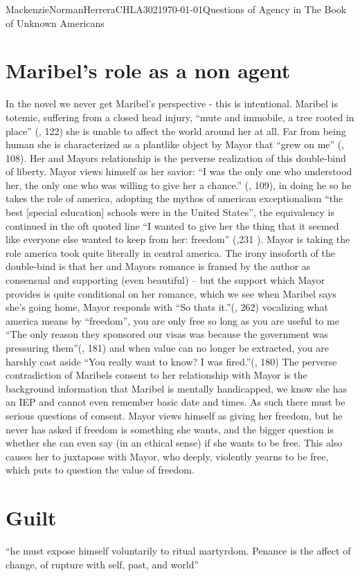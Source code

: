 \documentclass{article}
\begin{document}
\begin{mla}{Mackenzie}{Norman}{Herrera}{CHLA302}{\today}{Questions of Agency in The Book of Unknown Americans}
\section*{Maribel’s role as a non agent}
In the novel we never get Maribel's perspective - this is intentional. Maribel is totemic, suffering from a closed head injury,  ``mute and immobile, a tree rooted in place'' (\cite{Henriquez2014-sh}, 122) she is unable to affect the world around her at all. Far from being human she is characterized as a plantlike object by Mayor that ``grew on me'' (\cite{Henriquez2014-sh}, 108). Her and Mayors relationship is the perverse realization of this double-bind of liberty. Mayor views himself as her savior: ``I was the only one who understood her, the only one who was willing to give her a chance.'' (\cite{Henriquez2014-sh}, 109), in doing he so he takes the role of america, adopting the mythos of american exceptionalism ``the best [special education] schools were in the United States'', the equivalency is continued in the oft quoted line ``I wanted to give her the thing that it seemed like everyone else wanted to keep from her: freedom'' (\cite{Henriquez2014-sh},231 ). Mayor is taking the role america took quite literally in central america. The irony insoforth of the double-bind is that her and Mayors romance is framed by the author as consensual and supporting (even beautiful) -- but the support which Mayor provides is quite conditional on her romance, which we see when Maribel says she's going home, Mayor responds with ``So thats it.''(\cite{Henriquez2014-sh}, 262) vocalizing what america means by ``freedom'', you are only free so long as you are useful to me ``The only reason they sponsored our visas was because the government was pressuring them''(\cite{Henriquez2014-sh}, 181) and when value can no longer be extracted, you are harshly cast aside ``You really want to know? I was fired.''(\cite{Henriquez2014-sh}, 180) The perverse contradiction of Maribels consent to her relationship with Mayor is the background information that Maribel is mentally handicapped, we know she has an IEP and cannot even remember basic date and times. As such there must be serious questions of consent. Mayor views himself as giving her freedom, but he never has asked if freedom is something she wants, and the bigger question is whether she can even say (in an ethical sense) if she wants to be free. This also causes her to juxtapose with Mayor, who deeply, violently yearns to be free, which puts to question the value of freedom.
 

\section*{Guilt}
``he must expose himself voluntarily to ritual martyrdom. Penance is the affect of change, of rupture with self, past, and world''




\printbibliography

\end{mla}
\end{document}
